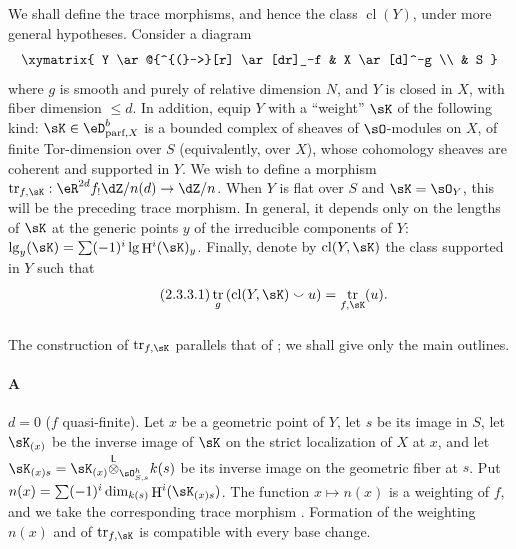 \documentclass[12pt,oneside,english]{smfbook}
\DeclareMathOperator{\cl}{cl}
\DeclareMathOperator{\h}{H}
\DeclareMathOperator{\tr}{tr}
\newcommand{\lotimes}{{\overset{\mathsf{L}}{\otimes}}}
\begin{document}
We shall define the trace morphisms, and hence the class $\cl(Y)$, under more general hypotheses. Consider a diagram
\[\xymatrix{
  Y \ar@{^{(}->}[r] \ar[dr]_-f
    & X \ar[d]^-g \\
  & S
}\]
where $g$ is smooth and purely of relative dimension $N$, and $Y$ is closed in $X$, with fiber dimension $\leqslant d$. In addition, equip $Y$ with a ``weight'' $\sK$ of the following kind: $\sK\in\eD_{\text{parf},X}^b$ is a bounded complex of sheaves of $\sO$-modules on $X$, of finite Tor-dimension over $S$ (equivalently, over $X$), whose cohomology sheaves are coherent and supported in $Y$. We wish to define a morphism $\tr_{f,\sK}:\eR^{2d}f_!\dZ/n(d)\to\dZ/n$. When $Y$ is flat over $S$ and $\sK=\sO_Y$, this will be the preceding trace morphism. In general, it depends only on the lengths of $\sK$ at the generic points $y$ of the irreducible components of $Y$: $\operatorname{lg}_y(\sK)=\sum(-1)^i\operatorname{lg}\h^i(\sK)_y$.
Finally, denote by $\cl(Y,\sK)$ the class supported in $Y$ such that
\begin{equation*}\tag{2.3.3.1}\label{IV:eq:2-3-3-1}
  \tr_g\left(\cl(Y,\sK)\smallsmile u\right) = \tr_{f,\sK}(u) \text{.}
\end{equation*}

\subsubsection{}\label{IV:2-3-4}

The construction of $\tr_{f,\sK}$ parallels that of \cite[XVIII.2]{sga4}; we shall give only the main outlines.

\paragraph{A}
$d=0$ ($f$ quasi-finite). Let $x$ be a geometric point of $Y$, let $s$ be its image in $S$, let $\sK_{(x)}$ be the inverse image of $\sK$ on the strict localization of $X$ at $x$, and let $\sK_{(x)s}=\sK_{(x)}\lotimes_{\sO_{S,s}^h}k(s)$ be its inverse image on the geometric fiber at $s$. Put $n(x)=\sum(-1)^i\dim_{k(s)}\h^i(\sK_{(x)s})$. The function $x\mapsto n(x)$ is a weighting of $f$, and we take the corresponding trace morphism \cite[XVII.6.2.5]{sga4}. Formation of the weighting $n(x)$ and of $\tr_{f,\sK}$ is compatible with every base change.
\end{document}
